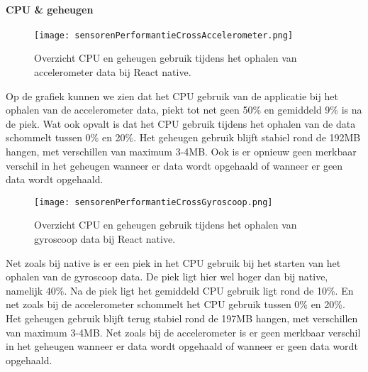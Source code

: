 \paragraph{CPU \& geheugen}
\begin{figure}[H]
    \centering
    \texttt{[image: sensorenPerformantieCrossAccelerometer.png]}
    \caption{Overzicht CPU en geheugen gebruik tijdens het ophalen van accelerometer data bij React native.}
\end{figure}
Op de grafiek kunnen we zien dat het CPU gebruik van de applicatie bij het ophalen van de accelerometer data,
piekt tot net geen 50\% en gemiddeld 9\% is na de piek. Wat ook opvalt is dat het CPU gebruik tijdens het ophalen 
van de data schommelt tussen 0\% en 20\%. Het geheugen gebruik blijft stabiel rond de 192MB hangen, met verschillen van 
maximum 3-4MB. Ook is er opnieuw geen merkbaar verschil in het 
geheugen wanneer er data wordt opgehaald of wanneer er geen data wordt opgehaald.
\begin{figure}[H]
    \centering
    \texttt{[image: sensorenPerformantieCrossGyroscoop.png]}
    \caption{Overzicht CPU en geheugen gebruik tijdens het ophalen van gyroscoop data bij React native.}
\end{figure}
Net zoals bij native is er een piek in het CPU gebruik bij het starten van het ophalen van de gyroscoop data. 
De piek ligt hier wel hoger dan bij native, namelijk 40\%. Na de piek ligt het gemiddeld CPU gebruik ligt rond de 10\%. 
En net zoals bij de accelerometer schommelt het CPU gebruik tussen 0\% en 20\%. Het geheugen gebruik blijft terug 
stabiel rond de 197MB hangen, met verschillen van maximum 3-4MB. Net zoals bij de accelerometer is er  
geen merkbaar verschil in het geheugen wanneer er data wordt opgehaald of wanneer er geen 
data wordt opgehaald.